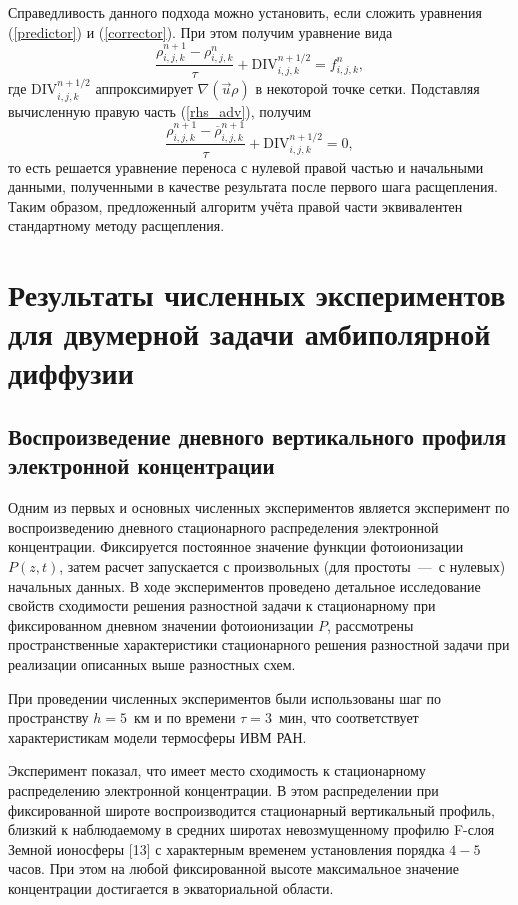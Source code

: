 \documentclass[14pt, a4paper]{extarticle}
\begin{document}
Справедливость данного подхода можно установить, если сложить уравнения (\ref{predictor}) и (\ref{corrector}). При этом получим  уравнение вида \begin{equation} \dfrac{\rho_{i, j, k}^{n+1} - \rho_{i, j, k}^n}{\tau} + \mathrm{DIV}_{i, j, k}^{n+1/2} = f_{i, j, k}^n,\end{equation} где $\mathrm{DIV}_{i, j, k}^{n+1/2}$ аппроксимирует $\nabla(\vec{u}\rho)$ в некоторой точке сетки. Подставляя вычисленную правую часть (\ref{rhs_adv}), получим \begin{equation} \dfrac{\rho_{i, j, k}^{n+1} - \overline{\rho}_{i, j, k}^{n+1}}{\tau} + \mathrm{DIV}_{i, j, k}^{n+1/2} = 0,\end{equation} то есть решается уравнение переноса с нулевой правой частью и начальными данными, полученными в качестве результата после первого шага расщепления. Таким образом, предложенный алгоритм учёта правой части эквивалентен стандартному методу расщепления.

\section{Результаты численных экспериментов для двумерной задачи амбиполярной диффузии}


\subsection{Воспроизведение дневного вертикального профиля электронной концентрации}

Одним из первых и основных численных экспериментов является эксперимент по воспроизведению дневного стационарного распределения электронной концентрации. Фиксируется постоянное значение функции фотоионизации $P(z, t)$, затем расчет запускается с произвольных (для простоты~---~с нулевых) начальных данных. В ходе экспериментов проведено детальное исследование свойств сходимости решения разностной задачи к стационарному при фиксированном дневном значении фотоионизации $P$, рассмотрены пространственные характеристики стационарного решения разностной задачи при реализации описанных выше разностных схем. 

При проведении численных экспериментов были использованы шаг по пространству $h = 5$~км и по времени $\tau = 3$~мин, что соответствует характеристикам модели термосферы ИВМ РАН.

Эксперимент показал, что имеет место сходимость к стационарному распределению электронной концентрации. В этом распределении при фиксированной широте воспроизводится стационарный вертикальный профиль, близкий к наблюдаемому в средних широтах невозмущенному профилю F-слоя Земной ионосферы [13] с характерным временем установления порядка $4-5$ часов. При этом на любой фиксированной высоте максимальное значение концентрации достигается в экваториальной области.
\end{document}
